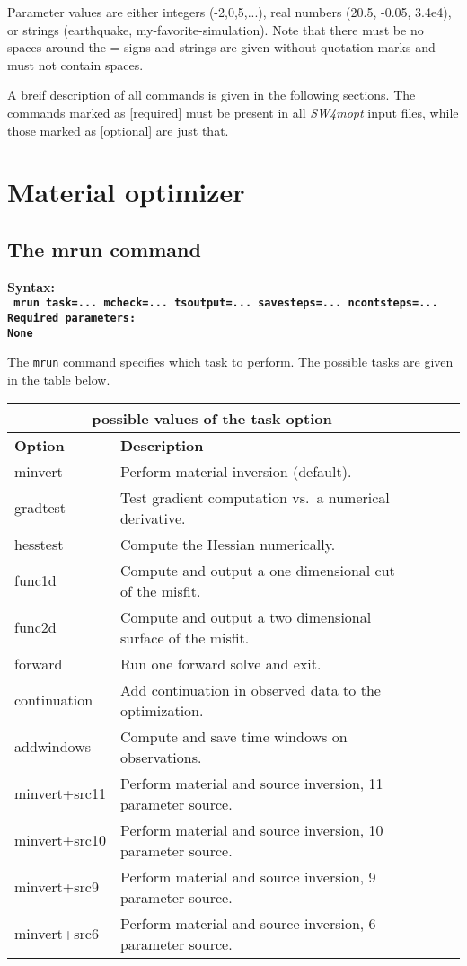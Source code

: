 \documentclass[12pt]{report}
\begin{document}
Parameter values are either integers (-2,0,5,...), real numbers (20.5, -0.05, 3.4e4), or strings
(earthquake, my-favorite-simulation). Note that there must be no spaces around the = signs and
strings are given without quotation marks and must not contain spaces. 

A breif description of all commands is given in the following sections. The commands marked as
[required] must be present in all \emph{SW4mopt} input files, while those marked as [optional] are just
that. 

\section{Material optimizer}

\subsection{The mrun command}\label{sec:mrun}
\begin{flushleft}\bf
Syntax:\\
\tt
mrun task=... mcheck=... tsoutput=... savesteps=... ncontsteps=... 
\\
\bf Required parameters:\\
\rm
None
\end{flushleft}
The \verb+mrun+ command specifies which task to perform. The possible tasks are
given in the table below. 
\begin{center}
\begin{tabular}{|l|p{8cm}|l|l|l|} \hline
\multicolumn{2}{|c|}{\bf possible values of the task option}\\ \hline
{\bf Option} & {\bf Description}           \\ \hline 
\hline
minvert     & Perform material inversion (default). \\ \hline
gradtest    & Test gradient computation vs.~a numerical derivative. \\ \hline
hesstest    & Compute the Hessian numerically.  \\ \hline
func1d      & Compute and output a one dimensional cut of the misfit. \\ \hline
func2d      & Compute and output a two dimensional surface of the misfit. \\ \hline
forward     & Run one forward solve and exit. \\ \hline
continuation& Add continuation in observed data to the optimization. \\ \hline
addwindows  & Compute and save time windows on observations. \\ \hline
minvert+src11& Perform material and source inversion, 11 parameter source. \\ \hline
minvert+src10& Perform material and source inversion, 10 parameter source. \\ \hline
minvert+src9& Perform material and source inversion, 9 parameter source. \\ \hline
minvert+src6& Perform material and source inversion, 6 parameter source. \\ \hline
\end{tabular}
\end{center}
\end{document}
